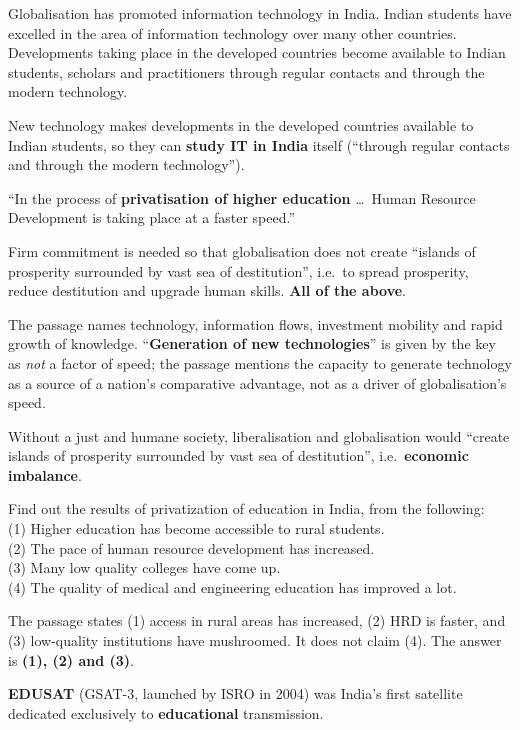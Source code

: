 Globalisation has promoted information technology in India. Indian students have excelled in the area of information technology over many other countries. Developments taking place in the developed countries become available to Indian students, scholars and practitioners through regular contacts and through the modern technology.

New technology makes developments in the developed countries available to Indian students, so they can \textbf{study IT in India} itself (``through regular contacts and through the modern technology'').

``In the process of \textbf{privatisation of higher education} \ldots\ Human Resource Development is taking place at a faster speed.''

Firm commitment is needed so that globalisation does not create ``islands of prosperity surrounded by vast sea of destitution'', i.e.\ to spread prosperity, reduce destitution and upgrade human skills. \textbf{All of the above}.

The passage names technology, information flows, investment mobility and rapid growth of knowledge. ``\textbf{Generation of new technologies}'' is given by the key as \emph{not} a factor of speed; the passage mentions the capacity to generate technology as a source of a nation's comparative advantage, not as a driver of globalisation's speed.

Without a just and humane society, liberalisation and globalisation would ``create islands of prosperity surrounded by vast sea of destitution'', i.e.\ \textbf{economic imbalance}.

Find out the results of privatization of education in India, from the following:\\
(1) Higher education has become accessible to rural students.\\
(2) The pace of human resource development has increased.\\
(3) Many low quality colleges have come up.\\
(4) The quality of medical and engineering education has improved a lot.

The passage states (1) access in rural areas has increased, (2) HRD is faster, and (3) low-quality institutions have mushroomed. It does not claim (4). The answer is \textbf{(1), (2) and (3)}.

\textbf{EDUSAT} (GSAT-3, launched by ISRO in 2004) was India's first satellite dedicated exclusively to \textbf{educational} transmission.

